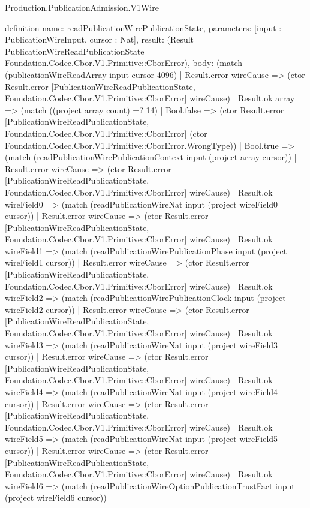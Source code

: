 \begin{lexlean}{Production.PublicationAdmission.V1Wire}
\begin{semanticmodule}
definition{
  name: readPublicationWirePublicationState,
  parameters: [input : PublicationWireInput, cursor : Nat],
  result: (Result PublicationWireReadPublicationState Foundation.Codec.Cbor.V1.Primitive::CborError),
  body: (match (publicationWireReadArray input cursor 4096)
    | Result.error wireCause => (ctor Result.error [PublicationWireReadPublicationState, Foundation.Codec.Cbor.V1.Primitive::CborError] wireCause)
    | Result.ok array => (match ((project array count) =? 14)
      | Bool.false => (ctor Result.error [PublicationWireReadPublicationState, Foundation.Codec.Cbor.V1.Primitive::CborError] (ctor Foundation.Codec.Cbor.V1.Primitive::CborError.WrongType))
      | Bool.true => (match (readPublicationWirePublicationContext input (project array cursor))
        | Result.error wireCause => (ctor Result.error [PublicationWireReadPublicationState, Foundation.Codec.Cbor.V1.Primitive::CborError] wireCause)
        | Result.ok wireField0 => (match (readPublicationWireNat input (project wireField0 cursor))
          | Result.error wireCause => (ctor Result.error [PublicationWireReadPublicationState, Foundation.Codec.Cbor.V1.Primitive::CborError] wireCause)
          | Result.ok wireField1 => (match (readPublicationWirePublicationPhase input (project wireField1 cursor))
            | Result.error wireCause => (ctor Result.error [PublicationWireReadPublicationState, Foundation.Codec.Cbor.V1.Primitive::CborError] wireCause)
            | Result.ok wireField2 => (match (readPublicationWirePublicationClock input (project wireField2 cursor))
              | Result.error wireCause => (ctor Result.error [PublicationWireReadPublicationState, Foundation.Codec.Cbor.V1.Primitive::CborError] wireCause)
              | Result.ok wireField3 => (match (readPublicationWireNat input (project wireField3 cursor))
                | Result.error wireCause => (ctor Result.error [PublicationWireReadPublicationState, Foundation.Codec.Cbor.V1.Primitive::CborError] wireCause)
                | Result.ok wireField4 => (match (readPublicationWireNat input (project wireField4 cursor))
                  | Result.error wireCause => (ctor Result.error [PublicationWireReadPublicationState, Foundation.Codec.Cbor.V1.Primitive::CborError] wireCause)
                  | Result.ok wireField5 => (match (readPublicationWireNat input (project wireField5 cursor))
                    | Result.error wireCause => (ctor Result.error [PublicationWireReadPublicationState, Foundation.Codec.Cbor.V1.Primitive::CborError] wireCause)
                    | Result.ok wireField6 => (match (readPublicationWireOptionPublicationTrustFact input (project wireField6 cursor))
}
\end{semanticmodule}
\end{lexlean}
